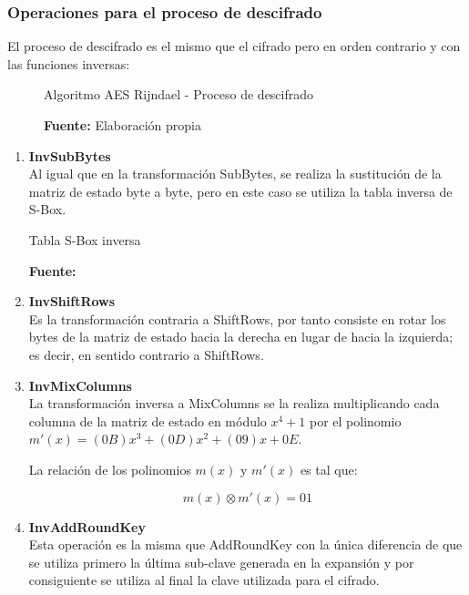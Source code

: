 \documentclass[../main/main.tex]{subfiles}
\begin{document}
    \subsubsection{Operaciones para el proceso de descifrado}
      El proceso de descifrado es el mismo que el cifrado pero en orden contrario y con las funciones inversas:

      \begin{figure}[H]
        \centering
        \caption{Algoritmo AES Rijndael - Proceso de descifrado}
        
        \caption*{\textbf{Fuente:} Elaboración propia}
      \end{figure}

      \begin{enumerate}[label=\textbf{\arabic*}.]
        \item \textbf{InvSubBytes} \\
          Al igual que en la transformación SubBytes, se realiza la sustitución de la matriz de estado byte a byte, pero en este caso se utiliza la tabla inversa de S-Box.

          \begin{table}[H]
            \scriptsize
            \centering
            \caption{Tabla S-Box inversa}
            
            \caption*{\textbf{Fuente:} \cite{report:seguridad_europea_eeuu}}
          \end{table}

        \item \textbf{InvShiftRows} \\
          Es la transformación contraria a ShiftRows, por tanto consiste en rotar los bytes de la matriz de estado hacia la derecha en lugar de hacia la izquierda; es decir, en sentido contrario a ShiftRows.

          \begin{table}[H]
            \centering
            
          \end{table}

        \item \textbf{InvMixColumns} \\
          La transformación inversa a MixColumns se la realiza multiplicando cada columna de la matriz de estado en módulo $x^4 + 1$ por el polinomio $m'(x) = (0B)x^3 + (0D)x^2 + (09)x + 0E$.

          La relación de los polinomios $m(x)$ y $m'(x)$ es tal que:

          \vspace{-0.7cm}\begin{equation}
            m(x) \otimes m'(x) = 01
          \end{equation}

        \item \textbf{InvAddRoundKey} \\
          Esta operación es la misma que AddRoundKey con la única diferencia de que se utiliza primero la última sub-clave generada en la expansión y por consiguiente se utiliza al final la clave utilizada para el cifrado.
      \end{enumerate}
\end{document}
